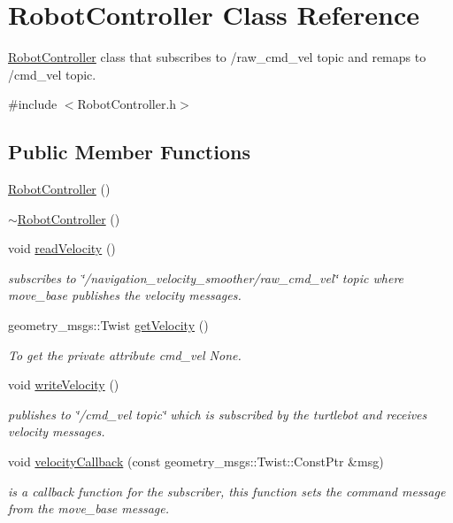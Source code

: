 \hypertarget{classRobotController}{}\section{Robot\+Controller Class Reference}
\label{classRobotController}


\hyperlink{classRobotController}{Robot\+Controller} class that subscribes to /raw\+\_\+cmd\+\_\+vel topic and remaps to /cmd\+\_\+vel topic.  




{\ttfamily \#include $<$Robot\+Controller.\+h$>$}

\subsection*{Public Member Functions}
\begin{DoxyCompactItemize}
\item 
\hyperlink{classRobotController_a1b3379c8c3350b2130f30c8bd23cba33}{Robot\+Controller} ()
\item 
\hyperlink{classRobotController_a4441cd6adf323a0ce3c454dc4f02efaf}{$\sim$\+Robot\+Controller} ()
\item 
void \hyperlink{classRobotController_a3987f42087c62ea2fd82c425ec33a31b}{read\+Velocity} ()
\begin{DoxyCompactList}\small\item\em subscribes to \char`\"{}/navigation\+\_\+velocity\+\_\+smoother/raw\+\_\+cmd\+\_\+vel\char`\"{} topic where move\+\_\+base publishes the velocity messages. \end{DoxyCompactList}\item 
geometry\+\_\+msgs\+::\+Twist \hyperlink{classRobotController_a8016cd41d0d175cc3994f81785bb69ae}{get\+Velocity} ()
\begin{DoxyCompactList}\small\item\em To get the private attribute cmd\+\_\+vel  None. \end{DoxyCompactList}\item 
void \hyperlink{classRobotController_a14d95aa76b39dbde8a5ff34533ea4634}{write\+Velocity} ()
\begin{DoxyCompactList}\small\item\em publishes to \char`\"{}/cmd\+\_\+vel topic\char`\"{} which is subscribed by the turtlebot and receives velocity messages. \end{DoxyCompactList}\item 
void \hyperlink{classRobotController_a6297a4573ddb0d096f8f247a7add0cf1}{velocity\+Callback} (const geometry\+\_\+msgs\+::\+Twist\+::\+Const\+Ptr \&msg)
\begin{DoxyCompactList}\small\item\em is a callback function for the subscriber, this function sets the command message from the move\+\_\+base message. \end{DoxyCompactList}\end{DoxyCompactItemize}


